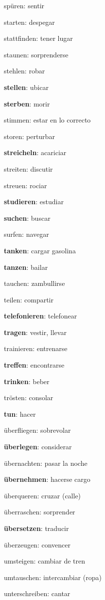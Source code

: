 \begin{multicols}{2}
\begin{myitemize}
\item spüren: sentir
\item starten: despegar
\item stattfinden: tener lugar
\item staunen: sorprenderse
\item stehlen: robar
\item \textbf{stellen}: ubicar
\item \textbf{sterben}: morir
\item stimmen: estar en lo correcto
\item storen: perturbar
\item \textbf{streicheln}: acariciar
\item streiten: discutir
\item streuen: rociar
\item \textbf{studieren}: estudiar
\item \textbf{suchen}: buscar
\item surfen: navegar
\item \textbf{tanken}: cargar gasolina
\item \textbf{tanzen}: bailar
\item tauchen: zambullirse
\item teilen: compartir
\item \textbf{telefonieren}: telefonear
\item \textbf{tragen}: vestir, llevar
\item trainieren: entrenarse
\item \textbf{treffen}: encontrarse
\item \textbf{trinken}: beber
\item trösten: consolar
\item \textbf{tun}: hacer
\item überfliegen: sobrevolar
\item \textbf{überlegen}: considerar
\item übernachten: pasar la noche
\item \textbf{übernehmen}: hacerse cargo
\item überqueren: cruzar (calle)
\item überraschen: sorprender
\item \textbf{übersetzen}: traducir
\item überzeugen: convencer
\item umsteigen: cambiar de tren
\item umtauschen: intercambiar (ropa)
\item unterschreiben: cantar

\end{myitemize}
\end{multicols}

